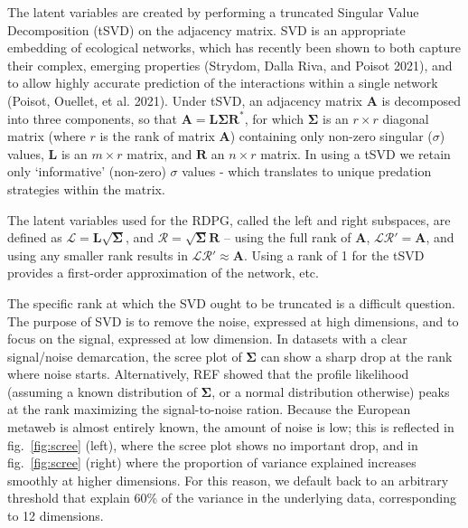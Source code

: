 \documentclass[10pt,oneside]{article}
\begin{document}
The latent variables are created by performing a truncated Singular
Value Decomposition (tSVD) on the adjacency matrix. SVD is an
appropriate embedding of ecological networks, which has recently been
shown to both capture their complex, emerging properties (Strydom, Dalla
Riva, and Poisot 2021), and to allow highly accurate prediction of the
interactions within a single network (Poisot, Ouellet, et al. 2021).
Under tSVD, an adjacency matrix \(\mathbf{A}\) is decomposed into three
components, so that
\(\mathbf{A} = \mathbf{L}\mathbf{\Sigma}\mathbf{R}^*\), for which
\(\mathbf{\Sigma}\) is an \(r \times r\) diagonal matrix (where \(r\) is
the rank of matrix \(\mathbf{A}\)) containing only non-zero singular
(\(\sigma\)) values, \(\mathbf{L}\) is an \(m \times r\) matrix, and
\(\mathbf{R}\) an \(n \times r\) matrix. In using a tSVD we retain only
`informative' (non-zero) \(\sigma\) values - which translates to unique
predation strategies within the matrix.

The latent variables used for the RDPG, called the left and right
subspaces, are defined as
\(\mathcal{L} = \mathbf{L}\sqrt{\mathbf{\Sigma}}\), and
\(\mathcal{R} = \sqrt{\mathbf{\Sigma}}\mathbf{R}\) -- using the full
rank of \(\mathbf{A}\), \(\mathcal{L}\mathcal{R}' = \mathbf{A}\), and
using any smaller rank results in
\(\mathcal{L}\mathcal{R}' \approx \mathbf{A}\). Using a rank of 1 for
the tSVD provides a first-order approximation of the network, etc.

The specific rank at which the SVD ought to be truncated is a difficult
question. The purpose of SVD is to remove the noise, expressed at high
dimensions, and to focus on the signal, expressed at low dimension. In
datasets with a clear signal/noise demarcation, the scree plot of
\(\mathbf{\Sigma}\) can show a sharp drop at the rank where noise
starts. Alternatively, REF showed that the profile likelihood (assuming
a known distribution of \(\mathbf{\Sigma}\), or a normal distribution
otherwise) peaks at the rank maximizing the signal-to-noise ration.
Because the European metaweb is almost entirely known, the amount of
noise is low; this is reflected in fig.~\ref{fig:scree} (left), where
the scree plot shows no important drop, and in fig.~\ref{fig:scree}
(right) where the proportion of variance explained increases smoothly at
higher dimensions. For this reason, we default back to an arbitrary
threshold that explain 60\% of the variance in the underlying data,
corresponding to 12 dimensions.
\end{document}
